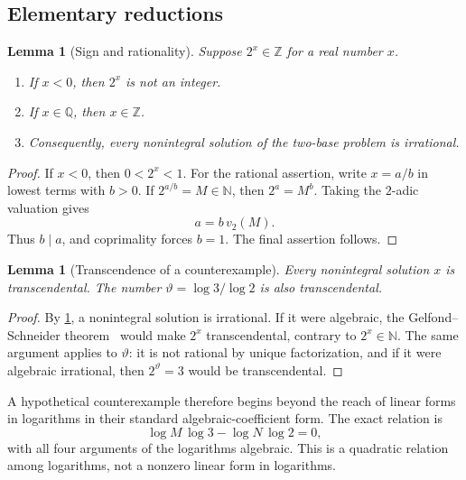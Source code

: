 \documentclass[11pt,oneside]{article}
\newtheorem{lemma}[theorem]{Lemma}
\theoremstyle{definition}
\newcommand{\Q}{\mathbb{Q}}
\newcommand{\Z}{\mathbb{Z}}
\newcommand{\N}{\mathbb{N}}
\begin{document}
\subsection{Elementary reductions}

\begin{lemma}[Sign and rationality]\label{lem:elementary}
Suppose $2^x\in\Z$ for a real number $x$.
\begin{enumerate}[label=\textup{(\roman*)}]
\item If $x<0$, then $2^x$ is not an integer.
\item If $x\in\Q$, then $x\in\Z$.
\item Consequently, every nonintegral solution of the two-base problem is irrational.
\end{enumerate}
\end{lemma}

\begin{proof}
If $x<0$, then $0<2^x<1$.  For the rational assertion, write $x=a/b$ in lowest terms with $b>0$.  If $2^{a/b}=M\in\N$, then $2^a=M^b$.  Taking the $2$-adic valuation gives
\[
      a=b\,v_2(M).
\]
Thus $b\mid a$, and coprimality forces $b=1$.  The final assertion follows.
\end{proof}

\begin{lemma}[Transcendence of a counterexample]\label{lem:transcendental-x}
Every nonintegral solution $x$ is transcendental.  The number $\vartheta=\log 3/\log 2$ is also transcendental.
\end{lemma}

\begin{proof}
By \cref{lem:elementary}, a nonintegral solution is irrational.  If it were algebraic, the Gelfond--Schneider theorem~\cite{Gelfond1960} would make $2^x$ transcendental, contrary to $2^x\in\N$.  The same argument applies to $\vartheta$: it is not rational by unique factorization, and if it were algebraic irrational, then $2^{\vartheta}=3$ would be transcendental.
\end{proof}

A hypothetical counterexample therefore begins beyond the reach of linear forms in logarithms in their standard algebraic-coefficient form.  The exact relation is
\begin{equation}\label{eq:logdet}
     \log M\,\log 3-\log N\,\log 2=0,
\end{equation}
with all four arguments of the logarithms algebraic.  This is a quadratic relation among logarithms, not a nonzero linear form in logarithms.
\end{document}
